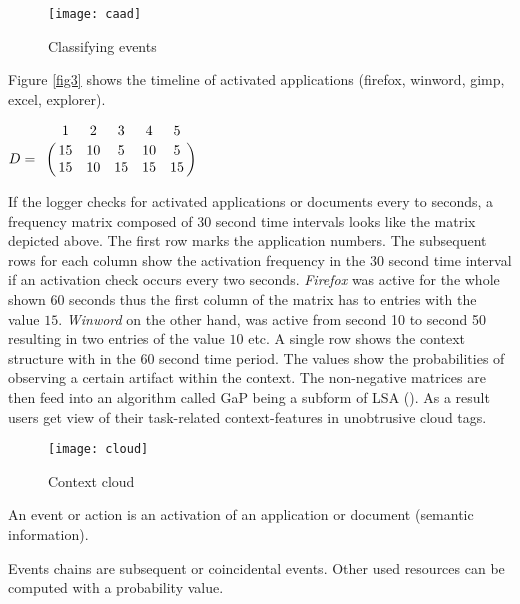 \begin{figure}[ht]
	\centering
  \texttt{[image: caad]}
	\caption{Classifying events}
	\label{fig7}
\end{figure}

Figure \ref{fig3} shows the timeline of activated applications (firefox, winword, gimp, excel, explorer).

\begin{center}
  \begin{math}
  D=
  \bordermatrix{
  & 1 & 2 & 3 & 4 & 5 \cr
  & 15 & 10 & 5 & 10 & 5\cr
  & 15 & 10 & 15 & 15 & 15}
  \end{math}\\
\end{center}

If the logger checks for activated applications or documents every to seconds, a frequency matrix composed of 30 second time intervals looks like the matrix depicted above. The first row marks the application numbers. The subsequent rows for each column show the activation frequency in the 30 second time interval if an activation check occurs every two seconds. \textit{Firefox} was active for the whole shown 60 seconds thus the first column of the matrix has to entries with the value $15$. \textit{Winword} on the other hand, was active from second 10 to second 50 resulting in two entries of the value $10$ etc. A single row shows the context structure with in the 60 second time period. The values show the probabilities of observing a certain artifact within the context. The non-negative matrices are then feed into an algorithm called \ac{GaP} being a subform of \ac{LSA} (\cite{canny2004gap}). As a result users get view of their task-related context-features in unobtrusive cloud tags.

\begin{figure}[ht]
	\centering
  \texttt{[image: cloud]}
	\caption{Context cloud}
	\label{fig4}
\end{figure}


An event or action is an activation of an application or document (semantic information).


Events chains are subsequent or coincidental events. Other used resources can be computed with a probability value.

